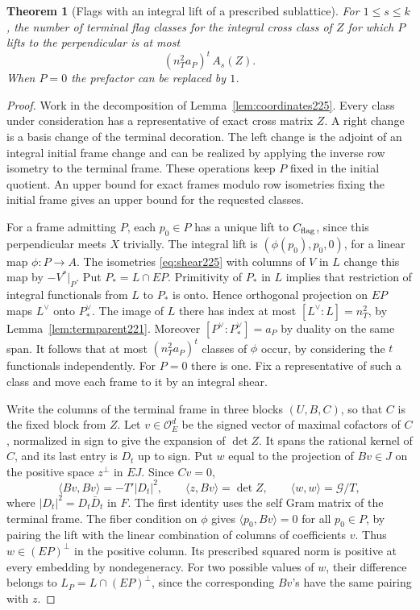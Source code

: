 \documentclass[a4paper,11pt]{article}
\newtheorem{theorem}[proposition]{Theorem}
\theoremstyle{definition}
\theoremstyle{remark}
\numberwithin{equation}{section}
\newcommand{\OO}{\mathcal O}
\begin{document}
\begin{theorem}[Flags with an integral lift of a prescribed sublattice]
\label{thm:frcount225}
For \(1\le s\le k\), the number of terminal flag classes
for the integral cross class of \(Z\) for which \(P\)
lifts to the perpendicular is at most
\begin{equation}
                 (n_T^2 a_P)^t\, A_s(Z) .\label{eq:frcount225}
\end{equation}
When \(P=0\) the prefactor can be replaced by \(1\).
\end{theorem}
\begin{proof}
Work in the decomposition of Lemma~\ref{lem:coordinates225}.
Every class under consideration has a representative of
exact cross matrix \(Z\). A right change is a basis change
of the terminal decoration. The left change is the adjoint
of an integral initial frame change and can be realized by
applying the inverse row isometry to the terminal frame.
These operations keep \(P\) fixed in the initial quotient.
An upper bound for exact frames modulo row isometries
fixing the initial frame gives an upper bound for the
requested classes.

For a frame admitting \(P\), each \(p_0\in P\) has a unique
lift to \(C_{\rm flag}\), since this perpendicular meets
\(X\) trivially. The integral lift is
\((\phi(p_0),p_0,0)\), for a linear map \(\phi:P\to A\).
The isometries \eqref{eq:shear225} with columns of \(V\)
in \(L\) change this map by \(-V^*|_P\). Put \(P_* =L\cap EP\).
Primitivity of \(P_*\) in \(L\) implies that restriction of
integral functionals from \(L\) to \(P_*\) is onto. Hence
orthogonal projection on \(EP\) maps \(L^\vee\) onto
\(P_*^\vee\). The image of \(L\) there has index at most
\([L^\vee:L]=n_T^2\), by Lemma~\ref{lem:termparent221}.
Moreover \([P^\vee:P_*^\vee]=a_P\) by duality on the same
span. It follows that at most \((n_T^2 a_P)^t\) classes of
\(\phi\) occur, by considering the \(t\) functionals
independently. For \(P=0\) there is one. Fix a representative
of such a class and move each frame to it by an integral shear.

Write the columns of the terminal frame in three blocks
\((U,B,C)\), so that \(C\) is the fixed block from \(Z\).
Let \(v\in\OO_E^d\) be the signed vector of maximal
cofactors of \(C\), normalized in sign to give the expansion
of \(\det Z\). It spans the rational kernel of \(C\),
and its last entry is \(D_t\) up to sign. Put \(w\) equal
to the projection of \(Bv\in J\) on the positive space
\(z^\perp\) in \(EJ\). Since \(Cv=0\),
\[
       \langle Bv,Bv\rangle=-T'|D_t|^2,\qquad
       \langle z,Bv\rangle=\det Z,\qquad
       \langle w,w\rangle=\mathcal G/T ,
\]
where \(|D_t|^2=D_t\bar D_t\) in \(F\). The first identity
uses the self Gram matrix of the terminal frame. The
fiber condition on \(\phi\) gives
\(\langle p_0,Bv\rangle=0\) for all \(p_0\in P\), by
pairing the lift with the linear combination of columns
of coefficients \(v\). Thus \(w\in (EP)^\perp\) in the
positive column. Its prescribed squared norm is positive
at every embedding by nondegeneracy. For two possible
values of \(w\), their difference belongs to
\(L_P=L\cap(EP)^\perp\), since the corresponding \(Bv\)'s
have the same pairing with \(z\).


\end{proof}
\end{document}
